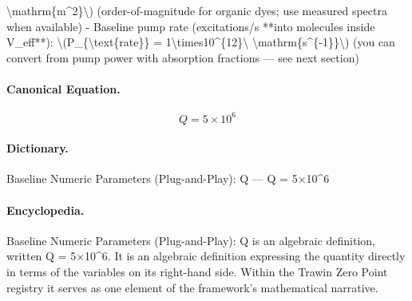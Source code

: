 \textbackslash{}mathrm\{m\textasciicircum{}2\}\textbackslash{}) (order-of-magnitude for organic dyes; use measured spectra when available) - Baseline pump rate (excitations/s **into molecules inside V\_eff**): \textbackslash{}(P\_\{\textbackslash{}text\{rate\}\} = 1\textbackslash{}times10\textasciicircum{}\{12\}\textbackslash{} \textbackslash{}mathrm\{s\textasciicircum{}\{-1\}\}\textbackslash{}) (you can convert from pump power with absorption fractions — see next section)

\paragraph{Canonical Equation.}
\[
Q = 5\times10^6
\]

\paragraph{Dictionary.}
Baseline Numeric Parameters (Plug-and-Play): Q — Q = 5×10\textasciicircum{}6

\paragraph{Encyclopedia.}
Baseline Numeric Parameters (Plug-and-Play): Q is an algebraic definition, written Q = 5×10\textasciicircum{}6. It is an algebraic definition expressing the quantity directly in terms of the variables on its right-hand side. Within the Trawin Zero Point registry it serves as one element of the framework's mathematical narrative.
